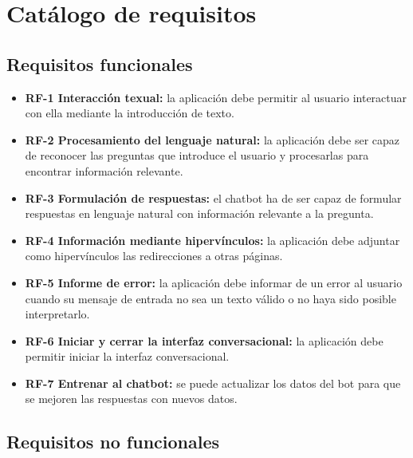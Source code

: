 \section{Catálogo de requisitos}

\subsection{Requisitos funcionales}

\begin{itemize}
\item \textbf{RF-1 Interacción texual:} la aplicación debe permitir al usuario interactuar con ella mediante la introducción de texto.
\item \textbf{RF-2 Procesamiento del lenguaje natural:} la aplicación debe ser capaz de reconocer las preguntas que introduce el usuario y procesarlas para encontrar información relevante.
\item \textbf{RF-3 Formulación de respuestas:} el chatbot ha de ser capaz de formular respuestas en lenguaje natural con información relevante a la pregunta.
\item \textbf{RF-4 Información mediante hipervínculos:} la aplicación debe adjuntar como hipervínculos las redirecciones a otras páginas.
\item \textbf{RF-5 Informe de error:} la aplicación debe informar de un error al usuario cuando su mensaje de entrada no sea un texto válido o no haya sido posible interpretarlo.
\item \textbf{RF-6 Iniciar y cerrar la interfaz conversacional:} la aplicación debe permitir iniciar la interfaz conversacional.
\item \textbf{RF-7 Entrenar al chatbot:} se puede actualizar los datos del bot para que se mejoren las respuestas con nuevos datos.
	

\end{itemize}

\subsection{Requisitos no funcionales}

